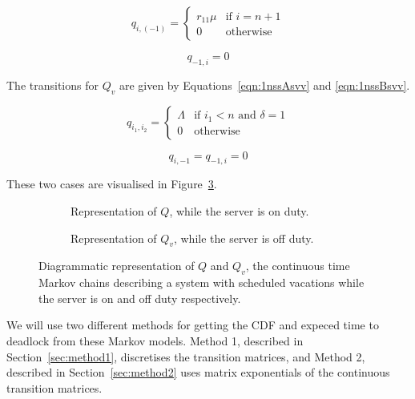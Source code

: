 \documentclass{article}
\begin{document}
\begin{equation}\label{eqn:1nssBsv}
  q_{i, (-1)} = \left\{
  \begin{array}{rr}
    r_{11}\mu & \text{if } i = n + 1 \\
    0 & \text{otherwise}
  \end{array}
  \right.
\end{equation}

\begin{equation}\label{eqn:1nssCsv}
  q_{-1, i} = 0
\end{equation}

The transitions for $Q_v$ are given by Equations~\ref{eqn:1nssAsvv} and \ref{eqn:1nssBsvv}.

\begin{equation}\label{eqn:1nssAsvv}
  q_{i_1, i_2} = \left\{
  \begin{array}{rr}
      \Lambda & \text{if } i_1 < n \text{ and } \delta = 1 \\
      0 & \text{otherwise}
  \end{array} \right.
\end{equation}

\begin{equation}\label{eqn:1nssBsvv}
  q_{i, -1} = q_{-1, i} = 0
\end{equation}

These two cases are visualised in Figure~\ref{fig:scheduledvacationsMC}.

\begin{figure}[!hbtp]
\begin{subfigure}[b]{\textwidth}
    
    \caption{Representation of $Q$, while the server is on duty.}
    \vspace{3cm}
    \label{fig:MCSVonduty}
\end{subfigure}
\begin{subfigure}[b]{\textwidth}
    
    \caption{Representation of $Q_v$, while the server is off duty.}
    \label{fig:MCSVoffduty}
\end{subfigure}
\caption{Diagrammatic representation of $Q$ and $Q_v$, the continuous time Markov chains describing a system with scheduled vacations while the server is on and off duty respectively.}
\label{fig:scheduledvacationsMC}
\end{figure}

We will use two different methods for getting the CDF and expeced time to deadlock from these Markov models.
Method 1, described in Section~\ref{sec:method1}, discretises the transition matrices, and Method 2, described in Section~\ref{sec:method2} uses matrix exponentials of the continuous transition matrices.
\end{document}
